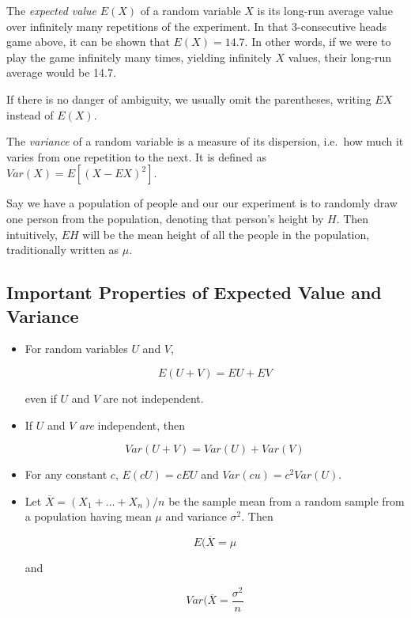 The \textit{expected value} $E(X)$ of a random variable $X$ is its long-run
average value over infinitely many repetitions of the experiment.  In
that 3-consecutive heads game above, it can be shown that $E(X) = 14.7$.
In other words, if we were to play the game infinitely many times,
yielding infinitely $X$ values, their long-run average would be 14.7.

If there is no danger of ambiguity, we usually omit the parentheses,
writing $EX$ instead of $E(X)$.

The \textit{variance} of a random variable is a measure of its
dispersion, i.e.\ how much it varies from one repetition to the next.
It is defined as $Var(X) = E[(X - EX)^2]$.

Say we have a population of people and our our experiment is to 
randomly draw one person from the population, denoting that person's
height by $H$.  Then intuitively, $EH$ will be the mean height of all
the people in the population, traditionally written as $\mu$.

\subsection{Important Properties of Expected Value and Variance}

\begin{itemize}

\item For random variables $U$ and $V$,

\begin{equation}
E(U+V) = EU + EV
\end{equation}

even if $U$ and $V$ are not independent.

\item If $U$ and $V$ \textit{are} independent, then

\begin{equation}
Var(U+V) = Var(U) + Var(V)
\end{equation}

\item For any constant $c$, $E(cU) = cEU$ and $Var(cu) = c^2 Var(U)$.

\item Let $\overline{X} = (X_1+...+X_n) / n$ be the sample mean from a
random sample from a population having mean $\mu$ and variance
$\sigma^2$.  Then

\begin{equation}
E(\overline{X} = \mu
\end{equation}

and

\begin{equation}
Var(\overline{X} = \frac{\sigma^2}{n}
\end{equation}

\end{itemize} 

